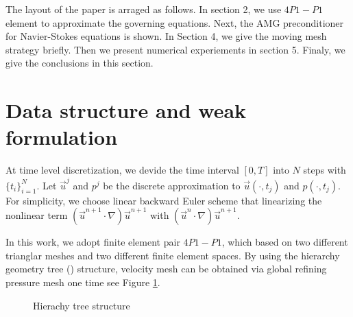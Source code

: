 \documentclass{eajam}
\begin{document}
       The layout of the paper is arraged as follows. In
    section 2, we use $4P1-P1$ element to approximate the governing
    equations. Next, the AMG preconditioner for
    Navier-Stokes equations is shown. In Section 4, we give the moving mesh
    strategy briefly. Then we present numerical experiements in section 5. 
    Finaly, we give the conclusions in this section.

   \section{Data structure and weak formulation}
   \label{sec2} At time level discretization, we devide the time
   interval $[0, T]$ into $N$ steps with $\{ t_i\}_{i = 1}^N$. Let
   $\vec{u}^j$ and $p^j$ be the discrete approximation to
   $\vec{u}(\cdot, t_j)$ and $p(\cdot, t_j)$. For simplicity, we
   choose linear backward Euler scheme that linearizing the
   nonlinear term $(\vec{u}^{n + 1} \cdot \nabla) \vec{u}^{n + 1}$
   with $(\vec{u}^n \cdot \nabla) \vec{u}^{n + 1}$.

   In this work, we adopt finite element pair $4P1-P1$,
   which based on two different trianglar meshes and two different
   finite element spaces. By using the hierarchy geometry tree
   (\cite{li2005multi}) structure, velocity mesh can be
   obtained via global refining pressure mesh one time see Figure
   \ref{fig::hgeometry_tree}.
   
   \begin{figure}[h]
     \caption{Hierachy tree structure}
     \label{fig::hgeometry_tree}
   \end{figure}
\end{document}
